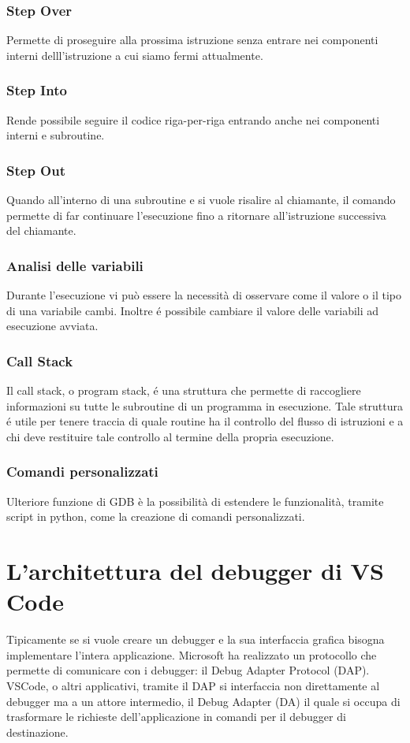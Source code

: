 \subsubsection{Step Over}
Permette di proseguire alla prossima istruzione senza entrare nei componenti interni delll'istruzione a cui siamo fermi attualmente.

\subsubsection{Step Into}
Rende possibile seguire il codice riga-per-riga entrando anche nei componenti interni e subroutine.

\subsubsection{Step Out}
Quando all'interno di una subroutine e si vuole risalire al chiamante, il comando  permette di far continuare l'esecuzione fino a ritornare all'istruzione successiva del chiamante.

\subsubsection{Analisi delle variabili}
Durante l'esecuzione vi può essere la necessità di osservare come il valore o il tipo di una variabile cambi. Inoltre é possibile cambiare il valore delle variabili ad esecuzione avviata.

\subsubsection{Call Stack}
Il call stack, o program stack, é una struttura che permette di raccogliere informazioni su tutte le subroutine di un programma in esecuzione. Tale struttura é utile per tenere traccia di quale routine ha il controllo del flusso di istruzioni e a chi deve restituire tale controllo al termine della propria esecuzione.

\subsubsection{Comandi personalizzati}
Ulteriore funzione di GDB è la possibilità di estendere le funzionalità, tramite script in python, come la creazione di comandi personalizzati.

\section{L'architettura del debugger di VS Code}
Tipicamente se si vuole creare un debugger e la sua interfaccia grafica bisogna implementare l'intera applicazione. Microsoft ha realizzato un protocollo che permette di comunicare con i debugger: il Debug Adapter Protocol (DAP). VSCode, o altri applicativi, tramite il DAP si interfaccia non direttamente al debugger ma a un attore intermedio, il Debug Adapter (DA) il quale si occupa di trasformare le richieste dell'applicazione in comandi per il debugger di destinazione.

